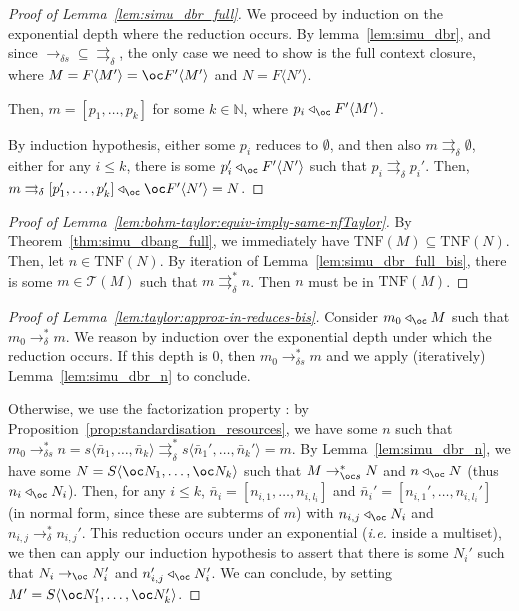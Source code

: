 \documentclass[10pt,a4paper]{article}
\newcommand{\<}{\langle}
\renewcommand{\>}{\rangle}
\newcommand{\todbs}{\to_{\oc s}} %
\newcommand{\todbf}{\to_{\oc}} %
\newcommand{\todbrs}{\to_{\delta s}} %
\newcommand{\todbrf}{\to_{\delta}} %
\newcommand{\totodbr}{\rightrightarrows_{\delta}} %
\newcommand{\app}{\triangleleft_\oc} %
\newcommand{\taylor}[1]{\ensuremath{\mathcal{T}(#1)}}
\newcommand{\taylornf}[1]{\ensuremath{\text{TNF}(#1)}}
\newcommand{\nativeemdash}{\ifmmode\text{\textemdash}\else\textemdash\fi}
\begin{document}
\begin{proof}[Proof of Lemma~\ref{lem:simu_dbr_full}]
	We proceed by induction on the exponential depth where the reduction
	occurs.	By lemma~\ref{lem:simu_dbr}, and since $\todbrs\subseteq\totodbr$, the
	only case we need to show is the full context closure, where $M=F\<M'\>=\oc
	F'\<M'\>$ and $N=F\<N'\>$. 

	Then, $m=[p_1,\dots ,p_k]$ for some $k\in\mathbb N$, where $p_i\app
	F'\<M'\>$.
	
	By induction hypothesis, either some $p_i$ reduces to $\emptyset$, and then also
	$m\totodbr \emptyset$, either for any $i\leq k$, there is some $p_i'\app
	F'\<N'\>$ such that $p_i\totodbr p_i'$. Then,
	$m\totodbr[p_1',\dots ,p_k']\app \oc F'\<N'\>=N$.
\end{proof}

\begin{proof}[Proof of Lemma~\ref{lem:bohm-taylor:equiv-imply-same-nfTaylor}]
	By Theorem~\ref{thm:simu_dbang_full}, we immediately have $\taylornf{M}\subseteq\taylornf{N}$.
	Then, let $n\in\taylornf N$. By iteration of Lemma~\ref{lem:simu_dbr_full_bis}, there
	is some $m\in\taylor M$ such that $m\totodbr^*n$. Then $n$ must
	be in $\taylornf M$. 
\end{proof}

\begin{proof}[Proof of Lemma~\ref{lem:taylor:approx-in-reduces-bis}]
	Consider $m_0\app M$ such that $m_0\todbrf^* m$. We reason by induction
	over the exponential depth under which the reduction occurs. If this
	depth is $0$, then $m_0\todbrs^*m$ and we apply (iteratively)
	Lemma~\ref{lem:simu_dbr_n} to conclude.

	Otherwise, we use the factorization property : by
	Proposition~\ref{prop:standardisation_resources}, we have some $n$ such
	that $m_0\todbrs^*n= s\<\bar n_1,\dots ,\bar n_k\>\totodbr^*s\<\bar n_1',\dots ,\bar n_k'\>=m$. By
	Lemma~\ref{lem:simu_dbr_n}, we have some $N=S\<\oc N_1,\dots ,\oc N_k\>$ such that $M\todbs^*N$ and
	$n\app N$ (thus $n_i\app N_i$). Then, for any $i\leq k$, $\bar
	n_i=[n_{i,1},\dots ,n_{i,l_i}]$ and $\bar n_i'=[n_{i,1}',\dots ,n_{i,l_i}']$ (in
	normal form, since these are subterms of $m$) with
	$n_{i,j}\app N_i$ and $n_{i,j}\todbrf^*n_{i,j}'$. This reduction occurs
	under an exponential (\emph{i.e.} inside a multiset), we then can apply
	our induction hypothesis to assert that there is some $N_i'$ such that
	$N_i\todbf N_i'$ and $n_{i,j}'\app N_i'$. We can conclude, by setting
	$M'=S\<\oc N_1',\dots ,\oc N_k'\>$.
\end{proof}
\end{document}
